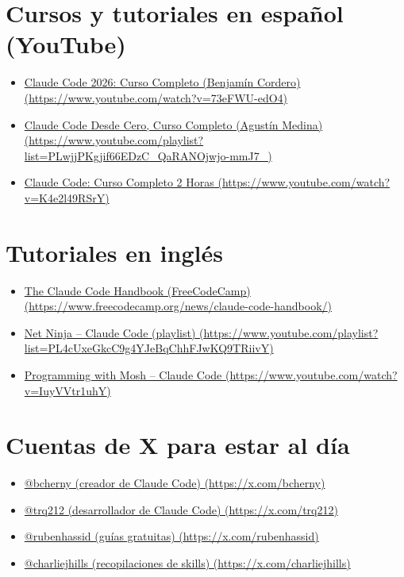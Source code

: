 \documentclass[11pt,a4paper]{report}
\begin{document}
\section{Cursos y tutoriales en español (YouTube)}

\begin{itemize}
\item \href{https://www.youtube.com/watch?v=73eFWU-edO4}{Claude Code 2026: Curso Completo (Benjamín Cordero) (\url{https://www.youtube.com/watch?v=73eFWU-edO4})}
\item \href{https://www.youtube.com/playlist?list=PLwjjPKgjif66EDzC\_QaRANOjwjo-mmJ7\_}{Claude Code Desde Cero, Curso Completo (Agustín Medina) (\url{https://www.youtube.com/playlist?list=PLwjjPKgjif66EDzC\_QaRANOjwjo-mmJ7\_})}
\item \href{https://www.youtube.com/watch?v=K4e2l49RSrY}{Claude Code: Curso Completo 2 Horas (\url{https://www.youtube.com/watch?v=K4e2l49RSrY})}
\end{itemize}

\section{Tutoriales en inglés}

\begin{itemize}
\item \href{https://www.freecodecamp.org/news/claude-code-handbook/}{The Claude Code Handbook (FreeCodeCamp) (\url{https://www.freecodecamp.org/news/claude-code-handbook/})}
\item \href{https://www.youtube.com/playlist?list=PL4cUxeGkcC9g4YJeBqChhFJwKQ9TRiivY}{Net Ninja – Claude Code (playlist) (\url{https://www.youtube.com/playlist?list=PL4cUxeGkcC9g4YJeBqChhFJwKQ9TRiivY})}
\item \href{https://www.youtube.com/watch?v=IuyVVtr1uhY}{Programming with Mosh – Claude Code (\url{https://www.youtube.com/watch?v=IuyVVtr1uhY})}
\end{itemize}

\section{Cuentas de X para estar al día}

\begin{itemize}
\item \href{https://x.com/bcherny}{@bcherny (creador de Claude Code) (\url{https://x.com/bcherny})}
\item \href{https://x.com/trq212}{@trq212 (desarrollador de Claude Code) (\url{https://x.com/trq212})}
\item \href{https://x.com/rubenhassid}{@rubenhassid (guías gratuitas) (\url{https://x.com/rubenhassid})}
\item \href{https://x.com/charliejhills}{@charliejhills (recopilaciones de skills) (\url{https://x.com/charliejhills})}
\end{itemize}
\end{document}
